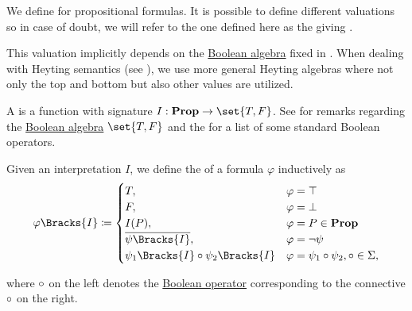 \begin{definition}\label{def:propositional_valuation}
  We define  for propositional formulas. It is possible to define different valuations so in case of doubt, we will refer to the one defined here as the  giving .

  This valuation implicitly depends on the \hyperref[def:boolean_algebra]{Boolean algebra} fixed in . When dealing with Heyting semantics (see ), we use more general Heyting algebras where not only the top and bottom but also other values are utilized.

  \begin{thmenum}
     A  is a function with signature \( I: \boldop{Prop} \to \set{ T, F } \). See  for remarks regarding the \hyperref[def:boolean_algebra]{Boolean algebra} \( \set{ T, F } \) and the  for a list of some standard Boolean operators.

     Given an interpretation \( I \), we define the  of a formula \( \varphi \) inductively as
    \begin{equation}\label{eq:def:propositional_valuation/formula_interpretation}
      \varphi\Bracks{I} \coloneqq \begin{cases}
        T,                                         &\varphi = \top \\
        F,                                         &\varphi = \bot \\
        I(P),                                      &\varphi = P \in \boldop{Prop} \\
        \overline{\psi\Bracks{I}},                 &\varphi = \neg \psi \\
        \psi_1\Bracks{I} \bincirc \psi_2\Bracks{I} &\varphi = \psi_1 \bincirc \psi_2, \bincirc \in \Sigma,
      \end{cases}
    \end{equation}
  \end{thmenum}
  where \( \mathbin \circ \) on the left denotes the \hyperref[def:standard_boolean_operators]{Boolean operator} corresponding to the connective \( \mathbin \circ \) on the right.
\end{definition}

